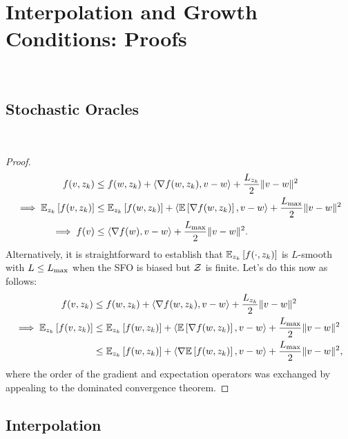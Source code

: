 
\section{Interpolation and Growth Conditions: Proofs}~\label{app:interpolation-gc}

\subsection{Stochastic Oracles}~\label{app:stochastic-oracles}

\indSmoothToSmooth*
\begin{proof}
\begin{align*}
    f(v, z_{k}) &\leq f(w, z_{k}) + \left\langle\nabla f(w, z_{k}), v - w\right\rangle + \frac{L_{z_{k}}}{2} \|v - w\|^2\\
    \implies \mathbb{E}_{z_{k}} \left[f(v, z_{k})\right] &\leq \mathbb{E}_{z_{k}} \left[f(w, z_{k})\right] + \left\langle\mathbb{E}\left[\nabla f(w, z_{k})\right], v - w\right\rangle + \frac{L_{\text{max}}}{2} \|v - w\|^2\\
    \implies f(v) &\leq \left\langle\nabla f(w), v - w\right\rangle + \frac{L_{\text{max}}}{2}\|v - w\|^2. 
\end{align*}
Alternatively, it is straightforward to establish that \( \mathbb{E}_{z_{k}} \left[f(\cdot, z_{k})\right] \) is \( L \)-smooth with \( L \leq L_{\text{max}} \) when the SFO is biased but \( \mathcal{Z} \) is finite.
Let's do this now as follows:
\begin{align*}
    f(v, z_{k}) &\leq f(w, z_{k}) + \left\langle\nabla f(w, z_{k}), v - w\right\rangle + \frac{L_{z_{k}}}{2} \|v - w\|^2\\
    \implies \mathbb{E}_{z_{k}} \left[f(v, z_{k})\right] &\leq \mathbb{E}_{z_{k}} \left[f(w, z_{k})\right] + \left\langle\mathbb{E}\left[\nabla f(w, z_{k})\right], v - w\right\rangle + \frac{L_{\text{max}}}{2} \|v - w\|^2\\
                                 &\leq \mathbb{E}_{z_{k}} \left[f(w, z_{k})\right] + \left\langle\nabla \mathbb{E}\left[f(w, z_{k})\right], v - w\right\rangle + \frac{L_{\text{max}}}{2} \|v - w\|^2,
\end{align*}
where the order of the gradient and expectation operators was exchanged by appealing to the dominated convergence theorem.
\end{proof}

\subsection{Interpolation}~\label{app:interpolation}

